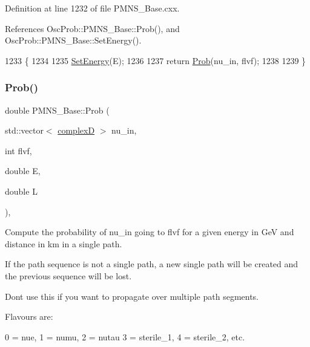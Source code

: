 Definition at line 1232 of file P\+M\+N\+S\+\_\+\+Base.\+cxx.



References Osc\+Prob\+::\+P\+M\+N\+S\+\_\+\+Base\+::\+Prob(), and Osc\+Prob\+::\+P\+M\+N\+S\+\_\+\+Base\+::\+Set\+Energy().


\begin{DoxyCode}
1233 \{
1234 
1235   \hyperlink{classOscProb_1_1PMNS__Base_a95b3b0d0cab5e6a54b5ef99587f837c0}{SetEnergy}(E);
1236 
1237   \textcolor{keywordflow}{return} \hyperlink{classOscProb_1_1PMNS__Base_aa2e10704d2d205a1ec8988de14b1a66f}{Prob}(nu\_in, flvf);
1238 
1239 \}
\end{DoxyCode}
\mbox{\label{classOscProb_1_1PMNS__Base_a01fba31729345376705e02408e835f67}} 
\subsubsection{\texorpdfstring{Prob()}{Prob()}\hspace{0.1cm}{\footnotesize\ttfamily [3/6]}}
{\footnotesize\ttfamily double P\+M\+N\+S\+\_\+\+Base\+::\+Prob (\begin{DoxyParamCaption}\item[{std\+::vector$<$ \hyperlink{EigenPoint_8h_a67ca8e107e20610c3fff78d5e726ece0}{complexD} $>$}]{nu\+\_\+in,  }\item[{int}]{flvf,  }\item[{double}]{E,  }\item[{double}]{L }\end{DoxyParamCaption})\hspace{0.3cm}{\ttfamily [virtual]}, {\ttfamily [inherited]}}

Compute the probability of nu\+\_\+in going to flvf for a given energy in GeV and distance in km in a single path.

If the path sequence is not a single path, a new single path will be created and the previous sequence will be lost.

Don\textquotesingle{}t use this if you want to propagate over multiple path segments.

Flavours are\+: 
\begin{DoxyPre}
  0 = nue, 1 = numu, 2 = nutau
  3 = sterile\_1, 4 = sterile\_2, etc.
\end{DoxyPre}
 
